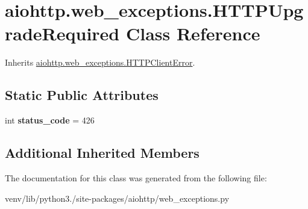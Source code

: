 \hypertarget{classaiohttp_1_1web__exceptions_1_1_h_t_t_p_upgrade_required}{}\section{aiohttp.\+web\+\_\+exceptions.\+H\+T\+T\+P\+Upgrade\+Required Class Reference}
\label{classaiohttp_1_1web__exceptions_1_1_h_t_t_p_upgrade_required}


Inherits \hyperlink{classaiohttp_1_1web__exceptions_1_1_h_t_t_p_client_error}{aiohttp.\+web\+\_\+exceptions.\+H\+T\+T\+P\+Client\+Error}.

\subsection*{Static Public Attributes}
\begin{DoxyCompactItemize}
\item 
\mbox{\label{classaiohttp_1_1web__exceptions_1_1_h_t_t_p_upgrade_required_a897bd45b3e1d52fc1be7a93be5f2e5fb}} 
int {\bfseries status\+\_\+code} = 426
\end{DoxyCompactItemize}
\subsection*{Additional Inherited Members}


The documentation for this class was generated from the following file\+:\begin{DoxyCompactItemize}
\item 
venv/lib/python3./site-\/packages/aiohttp/web\+\_\+exceptions.\+py\end{DoxyCompactItemize}
